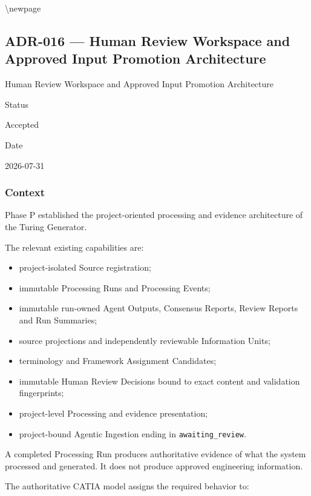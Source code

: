 \textbackslash newpage

\hypertarget{adr-016--human-review-workspace-and-approved-input-promotion-architecture}{%
\subsection{ADR-016 --- Human Review Workspace and Approved Input Promotion Architecture}\label{adr-016--human-review-workspace-and-approved-input-promotion-architecture}}

Human Review Workspace and Approved Input Promotion Architecture

Status

Accepted

Date

2026-07-31

\hypertarget{context-1}{%
\subsubsection{Context}\label{context-1}}

Phase P established the project-oriented processing and evidence architecture of the Turing Generator.

The relevant existing capabilities are:

\begin{itemize}
\tightlist
\item
  project-isolated Source registration;
\item
  immutable Processing Runs and Processing Events;
\item
  immutable run-owned Agent Outputs, Consensus Reports, Review Reports and Run Summaries;
\item
  source projections and independently reviewable Information Units;
\item
  terminology and Framework Assignment Candidates;
\item
  immutable Human Review Decisions bound to exact content and validation fingerprints;
\item
  project-level Processing and evidence presentation;
\item
  project-bound Agentic Ingestion ending in \texttt{awaiting\_review}.
\end{itemize}

A completed Processing Run produces authoritative evidence of what the system processed and generated. It does not produce approved engineering information.

The authoritative CATIA model assigns the required behavior to:

